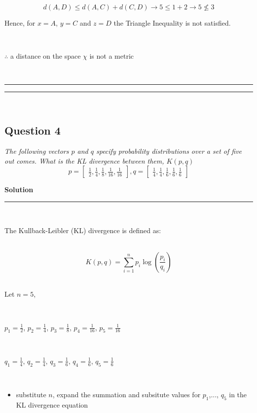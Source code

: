 \documentclass{article}
\begin{document}
$$d(A,D) \leq d(A,C) + d(C,D) \rightarrow 5 \leq 1 + 2 \rightarrow 5 \nleq 3$$

\parbox{\textwidth}{Hence, for $x=A$, $y=C$ and $z=D$ the Triangle Inequality is not satisfied.}\\

\parbox{\textwidth}{$\therefore$ a distance on the space $\chi$ is not a metric}\\

\noindent\rule{\textwidth}{0.4pt}
\noindent\rule{\textwidth}{0.4pt}\\

\newpage

\subsection*{Question 4}
\textit{The following vectors $p$ and $q$ specify probability distributions over a set of five out comes. What is the KL divergence between them, $K(p,q)$}\\

$$p =\begin{bmatrix}
    \frac{1}{2} , \frac{1}{4} , \frac{1}{8} , \frac{1}{16} , \frac{1}{16}
\end{bmatrix} , q = \begin{bmatrix}
    \frac{1}{4} , \frac{1}{4} , \frac{1}{6} , \frac{1}{6} , \frac{1}{6}
\end{bmatrix}$$

\textbf{Solution}

\noindent\rule{\textwidth}{0.4pt}\\

\parbox{\textwidth}{The Kullback-Leibler (KL) divergence is defined as:}\\

$$K(p,q) = \sum^n_{i=1} p_i \log\left(\frac{p_i}{q_i}\right)$$\\


\parbox{\textwidth}{Let $n = 5$,}\\

\parbox{\textwidth}{$p_1 = \frac{1}{2}$, $p_2 = \frac{1}{4}$, $p_3 = \frac{1}{8}$, $p_4 = \frac{1}{16}$, $p_5 = \frac{1}{16}$}\\

\parbox{\textwidth}{$q_1 = \frac{1}{4}$, $q_2 = \frac{1}{4}$, $q_3 = \frac{1}{6}$, $q_4 = \frac{1}{6}$, $q_5 = \frac{1}{6}$}\\

\begin{itemize}
    \item {substitute $n$, expand the summation and subsitute values for $p_1$,..., $q_5$ in the KL divergence equation}\\
\end{itemize}
\end{document}
